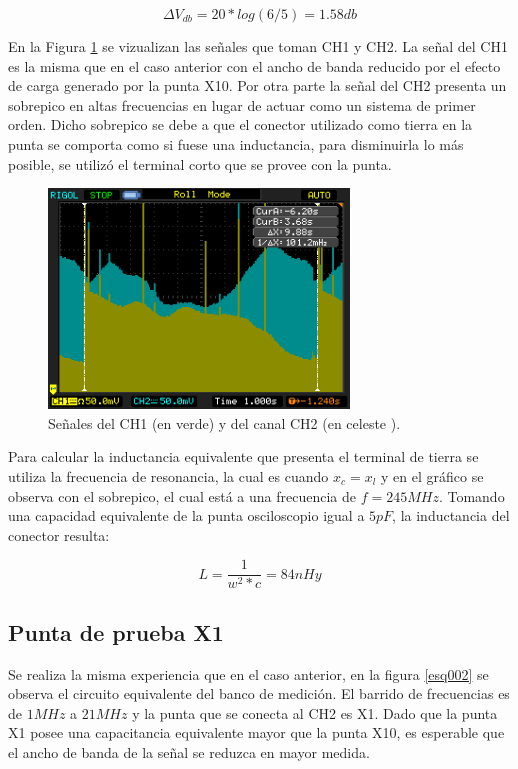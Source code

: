 \documentclass[a4paper,10pt]{article}
\begin{document}
		\begin{equation*}
			\Delta V_{db} = 20*log(6/5) = 1.58 db 
		\end{equation*}

		\indent En la Figura \ref{img000} se vizualizan las se\~nales que 
		toman CH1 y CH2. La se\~nal del CH1 es la misma que en el caso 
		anterior con el ancho de banda reducido por el efecto de carga 
		generado por la punta X10. Por otra parte la se\~nal del CH2 presenta
		un sobrepico en altas frecuencias en lugar de actuar como un sistema 
		de primer orden. Dicho sobrepico se debe a que el conector utilizado 
		como tierra en la punta se comporta como si fuese una inductancia, 
		para disminuirla lo más posible, se utilizó el terminal corto que
		se provee con la punta. \\
		
		\begin{figure}[!htb]
			\centering
			\includegraphics[width=8cm]
			{Imagenes/Mediciones instrumentos/NewFile0.png}
			\caption{Se\~nales del CH1 (en verde) y del canal CH2 (en celeste
			).} \label{img000}
		\end{figure}

		\indent Para calcular la inductancia equivalente que presenta el 
		terminal de tierra se utiliza la frecuencia de resonancia, la cual 
		es cuando $x_c = x_l$ y en el gráfico se observa con el sobrepico, el
		cual está a una frecuencia de $f = 245 MHz$. Tomando una capacidad 
		equivalente de la punta osciloscopio igual a $5pF$, la inductancia 
		del conector resulta:

		\begin{equation*}
			 L = \frac{1}{w^2*c} = 84 nHy 
		\end{equation*}

									
		\subsection{Punta de prueba X1}
		\indent Se realiza la misma experiencia que en el caso anterior, en la
		figura \ref{esq002} se observa el circuito equivalente del banco de 
		medición. El barrido de frecuencias es de $1MHz$ a $21MHz$ y la punta
		que se conecta al CH2 es X1. Dado que la punta X1 posee una 
		capacitancia equivalente mayor que la punta X10, es esperable que el 
		ancho de banda de la se\~nal se reduzca en mayor medida. \\
\end{document}
